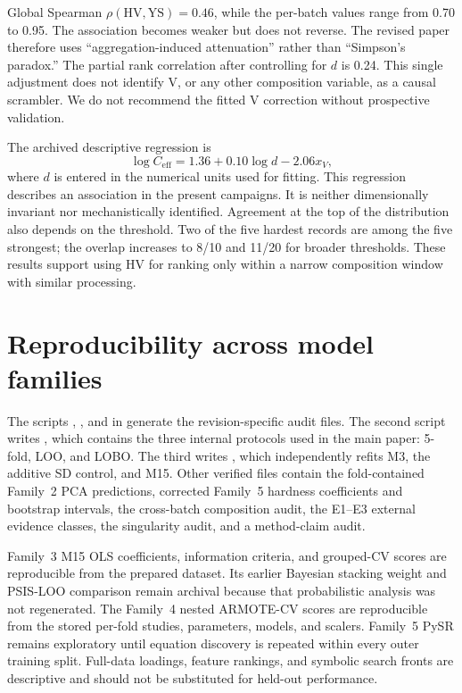 \documentclass[a4paper,11pt]{article}
\begin{document}
Global Spearman $\rho(\mathrm{HV},\mathrm{YS})=0.46$, while the per-batch values range from 0.70 to 0.95. The association becomes weaker but does not reverse. The revised paper therefore uses ``aggregation-induced attenuation'' rather than ``Simpson's paradox.'' The partial rank correlation after controlling for $d$ is 0.24. This single adjustment does not identify V, or any other composition variable, as a causal scrambler. We do not recommend the fitted V correction without prospective validation.

The archived descriptive regression is
\begin{equation}
\log C_{\mathrm{eff}}=1.36+0.10\log d-2.06x_V,
\end{equation}
where $d$ is entered in the numerical units used for fitting. This regression describes an association in the present campaigns. It is neither dimensionally invariant nor mechanistically identified. Agreement at the top of the distribution also depends on the threshold. Two of the five hardest records are among the five strongest; the overlap increases to 8/10 and 11/20 for broader thresholds. These results support using HV for ranking only within a narrow composition window with similar processing.

\section{Reproducibility across model families}
\label{si:diagnostics}

The scripts , , and  in  generate the revision-specific audit files. The second script writes , which contains the three internal protocols used in the main paper: 5-fold, LOO, and LOBO. The third writes , which independently refits M3, the additive SD control, and M15. Other verified files contain the fold-contained Family~2 PCA predictions, corrected Family~5 hardness coefficients and bootstrap intervals, the cross-batch composition audit, the E1--E3 external evidence classes, the singularity audit, and a method-claim audit.

Family~3 M15 OLS coefficients, information criteria, and grouped-CV scores are reproducible from the prepared dataset. Its earlier Bayesian stacking weight and PSIS-LOO comparison remain archival because that probabilistic analysis was not regenerated. The Family~4 nested ARMOTE-CV scores are reproducible from the stored per-fold studies, parameters, models, and scalers. Family~5 PySR remains exploratory until equation discovery is repeated within every outer training split. Full-data loadings, feature rankings, and symbolic search fronts are descriptive and should not be substituted for held-out performance.



\end{document}
